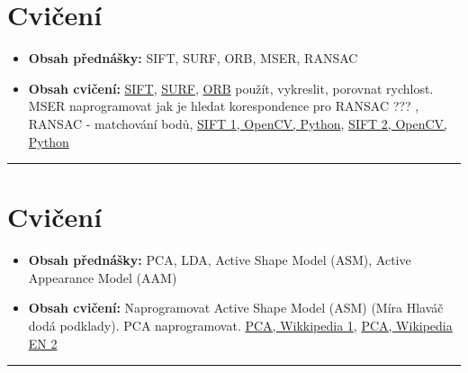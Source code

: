 \documentclass[12pt, a4paper]{article}
\begin{document}
\section{Cvičení}
\begin{itemize}
	\item \par{\textbf{Obsah přednášky:} SIFT, SURF, ORB, MSER, RANSAC}
	\item \par{\textbf{Obsah cvičení:} \href{http://docs.opencv.org/trunk/doc/py_tutorials/py_feature2d/py_sift_intro/py_sift_intro.html?highlight=sift}{SIFT}, \href{http://docs.opencv.org/trunk/doc/py_tutorials/py_feature2d/py_surf_intro/py_surf_intro.html?highlight=surf}{SURF}, \href{http://docs.opencv.org/trunk/doc/py_tutorials/py_feature2d/py_orb/py_orb.html}{ORB} použít, vykreslit, porovnat rychlost. MSER naprogramovat {\color{red}jak je hledat korespondence pro RANSAC ???} , RANSAC - matchování bodů, \href{http://docs.opencv.org/trunk/doc/py_tutorials/py_feature2d/py_sift_intro/py_sift_intro.html}{SIFT 1, OpenCV, Python}, \href{http://opencv-python-tutroals.readthedocs.org/en/latest/py_tutorials/py_feature2d/py_matcher/py_matcher.html}{SIFT 2, OpenCV, Python}}
\end{itemize}
\noindent\rule[0.5ex]{\linewidth}{0.4pt}












\section{Cvičení}
\begin{itemize}
	\item \par{\textbf{Obsah přednášky:} PCA, LDA, Active Shape Model (ASM), Active Appearance Model (AAM)}
	\item \par{\textbf{Obsah cvičení:} Naprogramovat Active Shape Model (ASM) ({\color{red}Míra Hlaváč dodá podklady}). PCA naprogramovat. \href{http://cs.wikipedia.org/wiki/Analýza_hlavních_komponent}{PCA, Wikkipedia 1}, \href{http://en.wikipedia.org/wiki/Principal_component_analysis}{PCA, Wikipedia EN 2}}
\end{itemize}
\noindent\rule[0.5ex]{\linewidth}{0.4pt}
\end{document}
